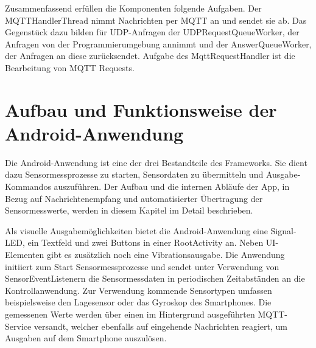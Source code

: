 \documentclass[11pt,a4paper]{report}
\begin{document}
Zusammenfassend erfüllen die Komponenten folgende Aufgaben.
Der MQTTHandlerThread nimmt Nachrichten per MQTT an und sendet sie ab.
Das Gegenstück dazu bilden für UDP-Anfragen der UDPRequestQueueWorker, der Anfragen von der Programmierumgebung annimmt und der AnswerQueueWorker, der Anfragen an diese zurücksendet.
Aufgabe des MqttRequestHandler ist die Bearbeitung von MQTT Requests.

\chapter{Aufbau und Funktionsweise der Android-Anwendung}\label{chap:app}
Die Android-Anwendung ist eine der drei Bestandteile des Frameworks.
Sie dient dazu Sensormessprozesse zu starten, Sensordaten zu übermitteln und Ausgabe-Kommandos auszuführen.
Der Aufbau und die internen Abläufe der App, in Bezug auf Nachrichtenempfang und automatisierter Übertragung der Sensormesswerte, werden in diesem Kapitel im Detail beschrieben.

Als visuelle Ausgabemöglichkeiten bietet die Android-Anwendung eine Signal-LED, ein Textfeld und zwei Buttons in einer RootActivity an.
Neben UI-Elementen gibt es zusätzlich noch eine Vibrationsausgabe. 
Die Anwendung initiiert zum Start Sensormessprozesse und sendet unter Verwendung von SensorEventListenern die Sensormessdaten in periodischen Zeitabständen an die Kontrollanwendung.
Zur Verwendung kommende Sensortypen umfassen beispielsweise den Lagesensor oder das Gyroskop des Smartphones.
Die gemessenen Werte werden über einen im Hintergrund ausgeführten MQTT-Service versandt, welcher ebenfalls auf eingehende Nachrichten reagiert, um Ausgaben auf dem Smartphone auszulösen.
\end{document}
